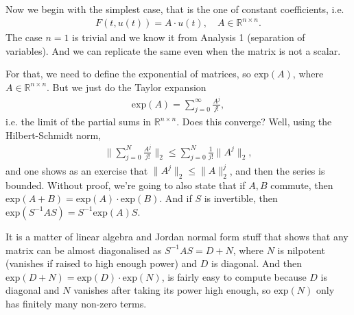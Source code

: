 Now we begin with the simplest case, that is the one of constant coefficients, i.e.
\begin{align*}
	F(t, u(t)) = A \cdot u(t), \quad A \in \mathbb{R}^{n \times n}.
\end{align*}
The case $n = 1$ is trivial and we know it from Analysis 1 (separation of variables). And we can replicate the same even when the matrix is not a scalar.

For that, we need to define the exponential of matrices, so $\text{exp}(A)$, where $A \in \mathbb{R}^{n \times n}$. But we just do the Taylor expansion
\begin{align*}
	\text{exp}(A) = \sum_{j = 0}^{\infty} \frac{A^{j}}{j!},
\end{align*}
i.e. the limit of the partial sums in $\mathbb{R}^{n \times n}$. Does this converge? Well, using the Hilbert-Schmidt norm,
\begin{align*}
	\lVert \sum_{j=0}^{N} \frac{A^{j}}{j!} \rVert_{2} \leq \sum_{j=0}^{N} \frac{1}{j!}\lVert A^{j} \rVert_{2},
\end{align*}
and one shows as an exercise that $\lVert A^{j} \rVert_{2} \leq \lVert A \rVert_{2}^{j}$, and then the series is bounded. Without proof, we're going to also state that if $A, B$ commute, then $\text{exp}(A+B) = \text{exp}(A) \cdot \text{exp}(B)$. And if $S$ is invertible, then $\text{exp}(S^{-1} A S) = S^{-1} \text{exp}(A) S$.

It is a matter of linear algebra and Jordan normal form stuff that shows that any matrix can be almost diagonalised as $S^{-1} A S = D + N$, where $N$ is nilpotent (vanishes if raised to high enough power) and $D$ is diagonal. And then $\text{exp}(D+N) = \text{exp}(D) \cdot \text{exp}(N)$, is fairly easy to compute because $D$ is diagonal and $N$ vanishes after taking its power high enough, so $\text{exp}(N)$ only has finitely many non-zero terms.

